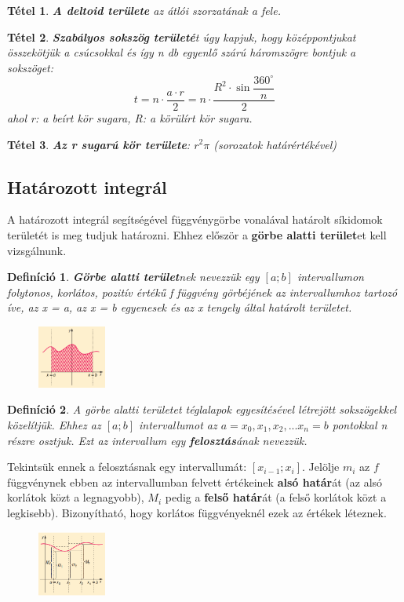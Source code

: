 \documentclass[12pt,a4paper]{article}
\newtheorem{theorem}{Tétel} [section]
\newtheorem{definition}{Definíció} [section]
\begin{document}
\begin{theorem}
\textbf{A deltoid területe} az átlói szorzatának a fele.
\end{theorem}

\begin{theorem}
\textbf{Szabályos sokszög területé}t úgy kapjuk, hogy középpontjukat összekötjük a csúcsokkal és így n db egyenlő szárú háromszögre bontjuk a sokszöget:
$$t=n\cdot \dfrac{a\cdot r}{2}=n\cdot \dfrac{R^2\cdot \sin \dfrac{360^\circ}{n}}{2}$$
ahol r: a beírt kör sugara, R: a körülírt kör sugara.
\end{theorem}

\begin{theorem}
\textbf{Az r sugarú kör területe}: $r^2\pi$ (sorozatok határértékével)
\end{theorem}
\newpage
\subsection{Határozott integrál}
A határozott integrál segítségével függvénygörbe vonalával határolt síkidomok területét is meg tudjuk határozni. Ehhez először a \textbf{görbe alatti terület}et kell vizsgálnunk.
\begin{definition}
\textbf{Görbe alatti terület}nek nevezzük egy $[a; b]$ intervallumon folytonos, korlátos, pozitív értékű f függvény görbéjének az intervallumhoz tartozó íve, az x = a, az x = b egyenesek és az x tengely által határolt területet.

\begin{figure}[h!]
\centering
\includegraphics[width=0.2\textwidth]{gorbe_alatti_terulet_def}
\end{figure}
\end{definition}

\begin{definition}
A görbe alatti területet téglalapok egyesítésével létrejött sokszögekkel közelítjük. Ehhez az $[a; b]$ intervallumot az $a = x_0, x_1, x_2, ... x_n = b$ pontokkal n részre osztjuk. Ezt az intervallum egy \textbf{felosztás}ának nevezzük.
\end{definition}

Tekintsük ennek a felosztásnak egy intervallumát: $[x_{i - 1}; x_i]$. Jelölje $m_i$ az $f$ függvénynek ebben az intervallumban felvett értékeinek \textbf{alsó határ}át (az alsó korlátok közt a legnagyobb), $M_i$ pedig a \textbf{felső határ}át (a felső korlátok közt a legkisebb). Bizonyítható, hogy korlátos függvényeknél ezek az értékek léteznek.
\begin{figure}[h]
\centering
\includegraphics[width=0.2\textwidth]{gorbe_alatti_terulet_felosztasa}
\end{figure}
\end{document}
